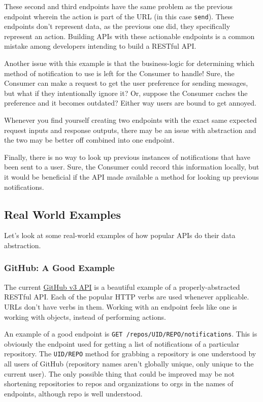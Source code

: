 \documentclass{book}
\begin{document}
These second and third endpoints have the same problem as the previous endpoint wherein the action is part of the URL (in this case \texttt{send}). These endpoints don't represent data, as the previous one did, they specifically represent an action. Building APIs with these actionable endpoints is a common mistake among developers intending to build a RESTful API.

Another issue with this example is that the business-logic for determining which method of notification to use is left for the Consumer to handle! Sure, the Consumer can make a request to get the user preference for sending messages, but what if they intentionally ignore it? Or, suppose the Consumer caches the preference and it becomes outdated? Either way users are bound to get annoyed.

Whenever you find yourself creating two endpoints with the exact same expected request inputs and response outputs, there may be an issue with abstraction and the two may be better off combined into one endpoint.

Finally, there is no way to look up previous instances of notifications that have been sent to a user. Sure, the Consumer could record this information locally, but it would be beneficial if the API made available a method for looking up previous notifications.

\subsection{Real World Examples}

Let's look at some real-world examples of how popular APIs do their data abstraction.

\subsubsection{GitHub: A Good Example}

The current \href{http://developer.github.com/v3/}{GitHub v3 API} is a beautiful example of a properly-abstracted RESTful API. Each of the popular HTTP verbs are used whenever applicable. URLs don't have verbs in them. Working with an endpoint feels like one is working with objects, instead of performing actions.

An example of a good endpoint is \texttt{GET /repos/UID/REPO/notifications}. This is obviously the endpoint used for getting a list of notifications of a particular repository. The \texttt{UID/REPO} method for grabbing a repository is one understood by all users of GitHub (repository names aren't globally unique, only unique to the current user). The only possible thing that could be improved may be not shortening repositories to repos and organizations to orgs in the names of endpoints, although repo is well understood.
\end{document}
